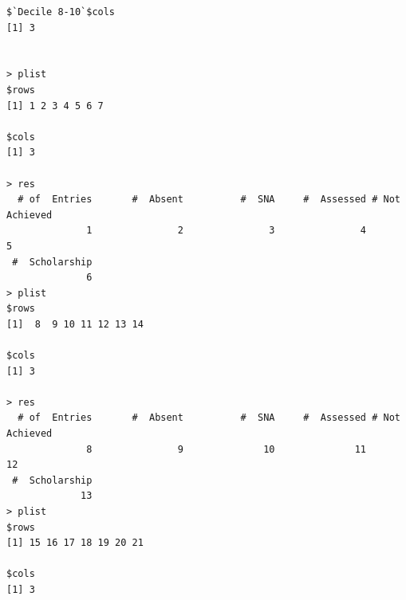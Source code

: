 \documentclass[a4paper]{article}
\begin{document}
\begin{verbatim}
$`Decile 8-10`$cols
[1] 3


> plist 
$rows
[1] 1 2 3 4 5 6 7

$cols
[1] 3

> res 
  # of  Entries       #  Absent          #  SNA     #  Assessed # Not  Achieved 
              1               2               3               4               5 
 #  Scholarship 
              6 
> plist 
$rows
[1]  8  9 10 11 12 13 14

$cols
[1] 3

> res 
  # of  Entries       #  Absent          #  SNA     #  Assessed # Not  Achieved 
              8               9              10              11              12 
 #  Scholarship 
             13 
> plist 
$rows
[1] 15 16 17 18 19 20 21

$cols
[1] 3


\end{verbatim}
\end{document}
